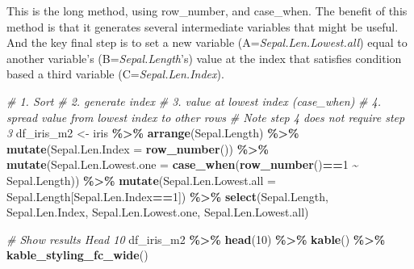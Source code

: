 \documentclass[
]{book}
\newenvironment{Shaded}{\begin{snugshade}}{\end{snugshade}}
\newcommand{\CommentTok}[1]{\textcolor[rgb]{0.56,0.35,0.01}{\textit{#1}}}
\newcommand{\DataTypeTok}[1]{\textcolor[rgb]{0.13,0.29,0.53}{#1}}
\newcommand{\DecValTok}[1]{\textcolor[rgb]{0.00,0.00,0.81}{#1}}
\newcommand{\KeywordTok}[1]{\textcolor[rgb]{0.13,0.29,0.53}{\textbf{#1}}}
\newcommand{\NormalTok}[1]{#1}
\newcommand{\OperatorTok}[1]{\textcolor[rgb]{0.81,0.36,0.00}{\textbf{#1}}}
\newcommand{\StringTok}[1]{\textcolor[rgb]{0.31,0.60,0.02}{#1}}
\begin{document}
This is the long method, using row\_number, and case\_when. The benefit of this method is that it generates several intermediate variables that might be useful. And the key final step is to set a new variable (A=\emph{Sepal.Len.Lowest.all}) equal to another variable's (B=\emph{Sepal.Length}'s) value at the index that satisfies condition based a third variable (C=\emph{Sepal.Len.Index}).

\begin{Shaded}
\begin{Highlighting}[]
\CommentTok{\# 1. Sort}
\CommentTok{\# 2. generate index}
\CommentTok{\# 3. value at lowest index (case\_when)}
\CommentTok{\# 4. spread value from lowest index to other rows}
\CommentTok{\# Note step 4 does not require step 3}
\NormalTok{df\_iris\_m2 \textless{}{-}}\StringTok{ }\NormalTok{iris }\OperatorTok{\%\textgreater{}\%}\StringTok{ }\KeywordTok{arrange}\NormalTok{(Sepal.Length) }\OperatorTok{\%\textgreater{}\%}
\StringTok{              }\KeywordTok{mutate}\NormalTok{(}\DataTypeTok{Sepal.Len.Index =} \KeywordTok{row\_number}\NormalTok{()) }\OperatorTok{\%\textgreater{}\%}
\StringTok{              }\KeywordTok{mutate}\NormalTok{(}\DataTypeTok{Sepal.Len.Lowest.one =}
                       \KeywordTok{case\_when}\NormalTok{(}\KeywordTok{row\_number}\NormalTok{()}\OperatorTok{==}\DecValTok{1} \OperatorTok{\textasciitilde{}}\StringTok{ }\NormalTok{Sepal.Length)) }\OperatorTok{\%\textgreater{}\%}
\StringTok{              }\KeywordTok{mutate}\NormalTok{(}\DataTypeTok{Sepal.Len.Lowest.all =}
\NormalTok{                       Sepal.Length[Sepal.Len.Index}\OperatorTok{==}\DecValTok{1}\NormalTok{]) }\OperatorTok{\%\textgreater{}\%}
\StringTok{              }\KeywordTok{select}\NormalTok{(Sepal.Length, Sepal.Len.Index,}
\NormalTok{                     Sepal.Len.Lowest.one, Sepal.Len.Lowest.all)}


\CommentTok{\# Show results Head 10}
\NormalTok{df\_iris\_m2 }\OperatorTok{\%\textgreater{}\%}\StringTok{ }\KeywordTok{head}\NormalTok{(}\DecValTok{10}\NormalTok{) }\OperatorTok{\%\textgreater{}\%}
\StringTok{  }\KeywordTok{kable}\NormalTok{() }\OperatorTok{\%\textgreater{}\%}
\StringTok{  }\KeywordTok{kable\_styling\_fc\_wide}\NormalTok{()}
\end{Highlighting}
\end{Shaded}
\end{document}
